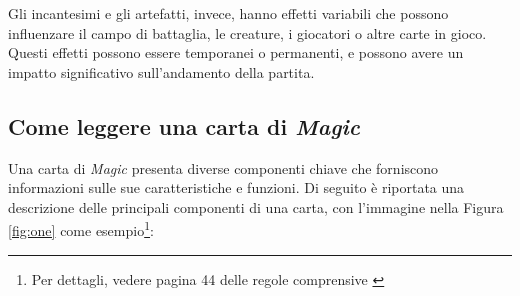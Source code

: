 Gli incantesimi e gli artefatti, invece, hanno effetti variabili che possono influenzare il campo di battaglia, le creature, i giocatori o altre carte in gioco. Questi effetti possono essere temporanei o permanenti, e possono avere un impatto significativo sull'andamento della partita.

\subsection{Come leggere una carta di \emph{Magic}}\label{subsec:mtg_cards}
Una carta di \emph{Magic} presenta diverse componenti chiave che forniscono informazioni sulle sue caratteristiche e funzioni. Di seguito è riportata una descrizione delle principali componenti di una carta, con l'immagine nella Figura \ref{fig:one} come esempio\footnote{ Per dettagli, vedere pagina 44 delle regole comprensive \cite{mtg-comp-rules}}:



